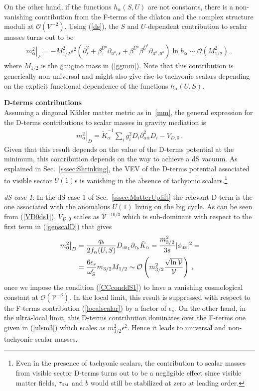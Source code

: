 \documentclass[12pt,a4paper]{book}
\def\nn{\nonumber}
\def\nn{\nonumber}
\def\SM{{\scriptscriptstyle \rm SM}}
\def\dS{{\scriptscriptstyle \rm dS}}
\newcommand{\mc}{\mathcal}
\begin{document}
On the other hand, if the functions $h_\alpha(S,U)$ are not constants, there is a non-vanishing contribution
from the F-terms of the dilaton and the complex structure moduli at $\mc{O}(\mathcal{V}^{-2})$. Using (\ref{ds}), the $S$ and $U$-dependent contribution to scalar masses turns out to be
\begin{align}
\left.m_\alpha^2\right|_F =  - M_{1/2}^2 s^2 \left(\partial_s^2+\beta^{U^a}\partial_{u^a, s}
+ \beta^{U^a}\beta^{\overline{U}^b}\partial_{u^a,u^b}\right) \ln h_\alpha\sim \mc{O}\left(M_{1/2}^2\right)\,,
\label{ulsm3}
\end{align}
where $M_{1/2}$ is the gaugino mass in (\ref{ggmm}). Note that this contribution is generically non-universal
and might also give rise to tachyonic scalars depending on the explicit functional dependence of the functions $h_\alpha(U,S)$.\\

\item \textbf{D-terms contributions}\\
Assuming a diagonal K\"ahler matter metric as in~\eqref{mm}, the general expression for the D-terms contributions to scalar masses in gravity mediation is~\cite{Dudas:2005vv}
\begin{align}
\left.m_\alpha^2\right|_D = \tilde{K}_\alpha^{-1} \sum_i g_i^2 D_i \partial^2_{\alpha \overline{\alpha}} D_i- V_{D,0}\,.
\label{genscalD}
\end{align}
Given that this result depends on the value of the D-terms potential at the minimum, this contribution depends on the way to achieve a dS vacuum. As explained in Sec.~\ref{sssec:Shrinking}, the VEV of the D-terms potential associated to visible sector $U(1)$s is vanishing in the absence of tachyonic scalars.\footnote{Even in the presence of tachyonic scalars, the contribution to scalar masses from visible sector D-terms turns out to be a negligible effect since visible matter fields, $\tau_\SM$ and $b$ would still be stabilized at zero at leading order.}

\medskip
\emph{dS case 1}: In the dS case 1 of Sec.~\ref{sssec:MatterUplift} the relevant D-term is the one associated with the anomalous $U(1)$ living on the big cycle. As can be seen from (\ref{VD0ds1}), $V_{D,0}$ scales as $\mathcal{V}^{-10/3}$ which is sub-dominant with respect to the first term in (\ref{genscalD}) that gives
\begin{align}
\left.m_0^2\right|_D &= \frac{q_b}{2 f_\alpha(U,S)} D_{\dS_1} \partial_{\tau_b} \tilde{K}_{\alpha}= \frac{m_{3/2}^2}{3s}|\phi_\dS|^2 = \nn \\
&= \frac{6\epsilon_s}{\omega'_S}m_{3/2}M_{1/2}\sim  \mc{O}\left(m_{3/2}^2\frac{\sqrt{\ln\mathcal{V}}}{\mathcal{V}}\right)\,,
\label{sc1}
\end{align}
once we impose the condition (\ref{CCconddS1}) to have a vanishing cosmological constant at $\mc{O}(\mathcal{V}^{-3})$. In the local limit, this result is suppressed with respect to the F-terms contribution (\ref{localscalar}) by a factor of $\epsilon_s$. On the other hand, in the ultra-local limit, this D-terms contribution dominates over the F-terms one given in (\ref{ulsm3}) which scales as $m_{3/2}^2\epsilon^2$.
Hence it leads to universal and non-tachyonic scalar masses.
\end{document}
